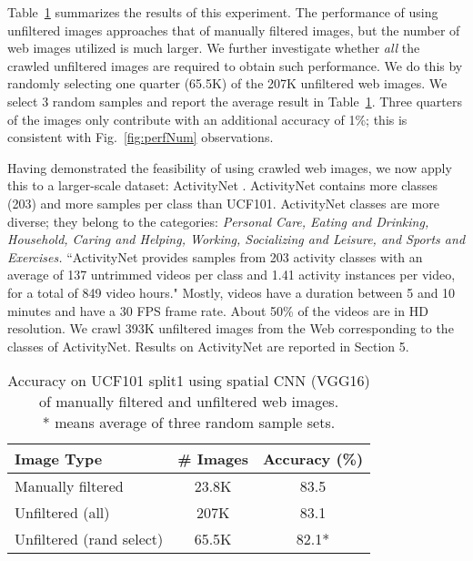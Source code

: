 \documentclass[10pt,twocolumn,letterpaper]{article}
\begin{document}
Table~\ref{tab:filtUnfilt} summarizes the results of this experiment. The performance of using unfiltered images approaches that of manually filtered images, but the number of web images utilized is much larger. We further investigate whether {\em all} the crawled unfiltered images are required to obtain such performance. We do this by randomly selecting one quarter (65.5K) of the 207K unfiltered web images. We select 3 random samples and report the average result in Table~\ref{tab:filtUnfilt}. Three quarters of the images only contribute with an additional accuracy of 1\%; this is consistent with Fig.~\ref{fig:perfNum} observations.



Having demonstrated the feasibility of using crawled web images, we now apply this to a larger-scale dataset: ActivityNet \cite{caba2015activitynet}. ActivityNet contains more classes (203) and more samples per class than UCF101. ActivityNet classes are more diverse; they belong to the categories: {\em Personal Care, Eating and Drinking, Household, Caring and Helping, Working, Socializing and Leisure, and Sports and Exercises.} ``ActivityNet provides samples from 203 activity classes with an average of 137 untrimmed videos per class and 1.41 activity instances per video, for a total of 849 video hours." \cite{caba2015activitynet} Mostly, videos have a duration between 5 and 10 minutes and have a 30 FPS frame rate. About 50\% of the videos are in HD resolution. We crawl 393K unfiltered images from the Web corresponding to the classes of ActivityNet. Results on ActivityNet are reported in Section 5.

\begin{table}[t]
\centering
\caption{Accuracy on UCF101 split1 using spatial CNN (VGG16) of manually filtered and unfiltered web images.\\ * {\footnotesize means average of three random sample sets.} }
\begin{tabular}{l | c c}
\hline \hline
Image Type                 & \# Images     & Accuracy (\%) \\ \hline 
Manually filtered          & 23.8K         &  83.5  \\ 
Unfiltered (all)                & 207K          &  83.1  \\ 
Unfiltered (rand select)          & 65.5K         &  { }{ }82.1*  \\ 
\hline \hline
\end{tabular}
\label{tab:filtUnfilt}
\end{table}
\end{document}
